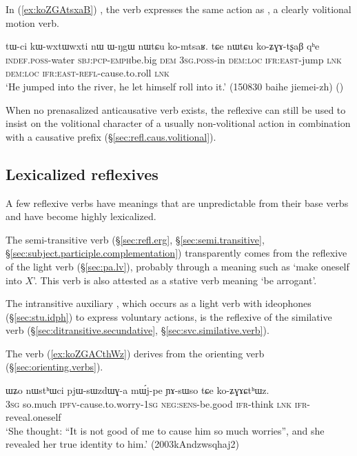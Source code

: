 In (\ref{ex:koZGAtsxaB}) , the verb  expresses the same action as , a clearly volitional motion verb.
 
\begin{exe}
\ex \label{ex:koZGAtsxaB}
\gll tɯ-ci kɯ-wxtɯ\redp{}wxti nɯ ɯ-ŋgɯ nɯtɕu ko-mtsaʁ. tɕe nɯtɕu ko-ʑɣɤ-tʂaβ qʰe     \\
\textsc{indef}.\textsc{poss}-water \textsc{sbj}:\textsc{pcp}-\textsc{emph}\redp{}be.big \textsc{dem} \textsc{3sg}.\textsc{poss}-in \textsc{dem}:\textsc{loc} \textsc{ifr}:\textsc{east}-jump \textsc{lnk} \textsc{dem}:\textsc{loc} \textsc{ifr}:\textsc{east}-\textsc{refl}-cause.to.roll \textsc{lnk}  \\
\glt `He jumped into the river, he let himself roll into it.' (150830 baihe jiemei-zh) ()
 \end{exe}

When no prenasalized anticausative verb exists, the reflexive can still be used to insist on the volitional character of a usually non-volitional action in combination with a causative prefix (§\ref{sec:refl.caus.volitional}).

\subsection{Lexicalized reflexives} \label{sec:lexicalized.refl}
A few reflexive verbs have meanings that are unpredictable from their base verbs and have become highly lexicalized.

The semi-transitive verb  (§\ref{sec:refl.erg}, §\ref{sec:semi.transitive}, §\ref{sec:subject.participle.complementation}) transparently comes from the reflexive of the light verb  (§\ref{sec:pa.lv}), probably through a meaning such as `make oneself into $X$'. This verb is also attested as a stative verb meaning `be arrogant'.

The intransitive auxiliary , which occurs as a light verb with ideophones (§\ref{sec:stu.idph}) to express voluntary actions, is the reflexive of the similative verb  (§\ref{sec:ditransitive.secundative}, §\ref{sec:svc.similative.verb}).

The verb  (\ref{ex:koZGACthWz}) derives from the orienting verb  (§\ref{sec:orienting.verbs}).

\begin{exe}
\ex \label{ex:koZGACthWz}
\gll  ɯʑo nɯstʰɯci pjɯ-sɯzdɯɣ-a mɯ́j-pe ɲɤ-sɯso tɕe ko-ʑɣɤɕtʰɯz. \\
\textsc{3sg} so.much \textsc{ipfv}-cause.to.worry-\textsc{1sg} \textsc{neg}:\textsc{sens}-be.good \textsc{ifr}-think \textsc{lnk} \textsc{ifr}-reveal.oneself \\
\glt `She thought: ``It is not good of me to cause him so much worries'', and she revealed her true identity to him.' (2003kAndzwsqhaj2)
 \end{exe}
 
